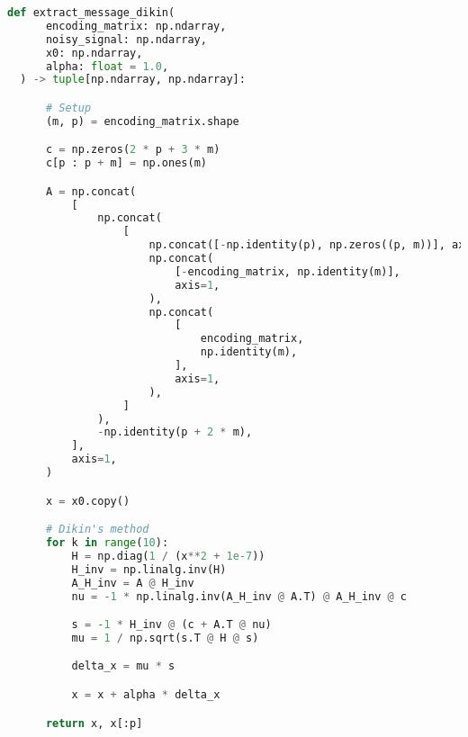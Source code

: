 \documentclass{article}
\begin{document}
\begin{minipage}{\linewidth}
  \begin{lstlisting}[language=Python, caption={Message decryption based on Dikin's method. The output is tuple of solution of the problem, and decrypted message itself}, label={lst:dikin}]
  def extract_message_dikin(
      encoding_matrix: np.ndarray,
      noisy_signal: np.ndarray,
      x0: np.ndarray,
      alpha: float = 1.0,
  ) -> tuple[np.ndarray, np.ndarray]:

      # Setup
      (m, p) = encoding_matrix.shape

      c = np.zeros(2 * p + 3 * m)
      c[p : p + m] = np.ones(m)

      A = np.concat(
          [
              np.concat(
                  [
                      np.concat([-np.identity(p), np.zeros((p, m))], axis=1),
                      np.concat(
                          [-encoding_matrix, np.identity(m)],
                          axis=1,
                      ),
                      np.concat(
                          [
                              encoding_matrix,
                              np.identity(m),
                          ],
                          axis=1,
                      ),
                  ]
              ),
              -np.identity(p + 2 * m),
          ],
          axis=1,
      )

      x = x0.copy()

      # Dikin's method
      for k in range(10):
          H = np.diag(1 / (x**2 + 1e-7))
          H_inv = np.linalg.inv(H)
          A_H_inv = A @ H_inv
          nu = -1 * np.linalg.inv(A_H_inv @ A.T) @ A_H_inv @ c

          s = -1 * H_inv @ (c + A.T @ nu)
          mu = 1 / np.sqrt(s.T @ H @ s)

          delta_x = mu * s

          x = x + alpha * delta_x

      return x, x[:p]
\end{lstlisting}
\end{minipage}
\end{document}
